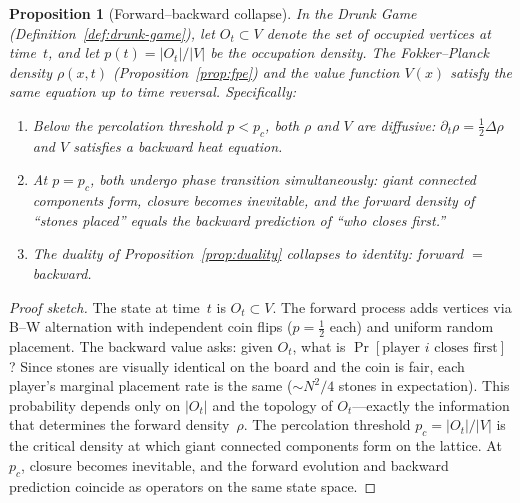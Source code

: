 \documentclass[11pt,a4paper]{article}
\newtheorem{proposition}[theorem]{Proposition}
\begin{document}
\begin{proposition}[Forward--backward collapse]%
\label{prop:fb-collapse}
In the Drunk Game (Definition~\ref{def:drunk-game}),
let $O_t \subset V$ denote the set of occupied vertices
at time~$t$, and let $p(t) = |O_t|/|V|$ be the occupation
density.
The Fokker--Planck density $\rho(x, t)$
(Proposition~\ref{prop:fpe}) and the value function
$V(x)$ satisfy the same equation up to time reversal.
Specifically:
\begin{enumerate}[label=(\alph*),nosep]
\item Below the percolation threshold $p < p_c$,
  both $\rho$ and $V$ are diffusive:
  $\partial_t \rho = \frac{1}{2}\Delta \rho$
  and $V$ satisfies a backward heat equation.
\item At $p = p_c$, both undergo phase transition
  simultaneously: giant connected components form,
  closure becomes inevitable, and the forward density
  of ``stones placed'' equals the backward prediction
  of ``who closes first.''
\item The duality of Proposition~\ref{prop:duality}
  collapses to identity: forward $=$ backward.
\end{enumerate}
\end{proposition}

\begin{proof}[Proof sketch]
The state at time~$t$ is $O_t \subset V$.
The forward process adds vertices via B--W alternation
with independent coin flips ($p = \tfrac{1}{2}$ each)
and uniform random placement.
The backward value asks: given $O_t$, what is
$\Pr[\text{player } i \text{ closes first}]$?
Since stones are visually identical on the board and
the coin is fair, each player's marginal placement
rate is the same ($\sim\! N^2/4$ stones in expectation).
This probability depends only on $|O_t|$ and the
topology of $O_t$---exactly the information that
determines the forward density~$\rho$.
The percolation threshold $p_c = |O_t|/|V|$ is the
critical density at which giant connected components
form on the lattice.
At~$p_c$, closure becomes inevitable, and the forward
evolution and backward prediction coincide as operators
on the same state space.
\end{proof}
\end{document}
